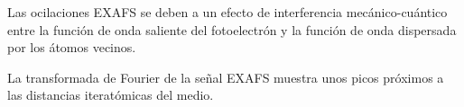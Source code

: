 Las ocilaciones EXAFS se deben a un efecto de interferencia 
mec\'anico-cu\'antico entre la funci\'on de onda saliente del 
fotoelectr\'on y la funci\'on de onda dispersada por los \'atomos
vecinos.

La transformada de Fourier de la se\~nal EXAFS muestra unos picos 
pr\'oximos a las distancias iterat\'omicas del medio.


